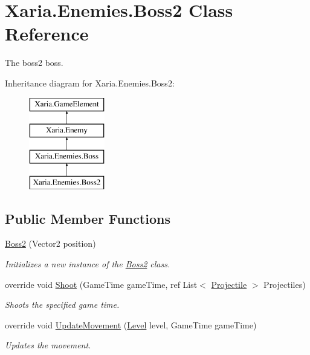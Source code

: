 \hypertarget{classXaria_1_1Enemies_1_1Boss2}{}\section{Xaria.\+Enemies.\+Boss2 Class Reference}
\label{classXaria_1_1Enemies_1_1Boss2}


The boss2 boss.  


Inheritance diagram for Xaria.\+Enemies.\+Boss2\+:\begin{figure}[H]
\begin{center}
\leavevmode
\includegraphics[height=4.000000cm]{classXaria_1_1Enemies_1_1Boss2}
\end{center}
\end{figure}
\subsection*{Public Member Functions}
\begin{DoxyCompactItemize}
\item 
\hyperlink{classXaria_1_1Enemies_1_1Boss2_a9fa63b6517248b98b0d9363f04516f00}{Boss2} (Vector2 position)
\begin{DoxyCompactList}\small\item\em Initializes a new instance of the \hyperlink{classXaria_1_1Enemies_1_1Boss2}{Boss2} class. \end{DoxyCompactList}\item 
override void \hyperlink{classXaria_1_1Enemies_1_1Boss2_ab1a3c2b68ec14481a3daba180782cce4}{Shoot} (Game\+Time game\+Time, ref List$<$ \hyperlink{classXaria_1_1Projectile}{Projectile} $>$ Projectiles)
\begin{DoxyCompactList}\small\item\em Shoots the specified game time. \end{DoxyCompactList}\item 
override void \hyperlink{classXaria_1_1Enemies_1_1Boss2_a6121cd1be6449c71e579ab4d59398a9a}{Update\+Movement} (\hyperlink{classXaria_1_1Level}{Level} level, Game\+Time game\+Time)
\begin{DoxyCompactList}\small\item\em Updates the movement. \end{DoxyCompactList}\end{DoxyCompactItemize}
